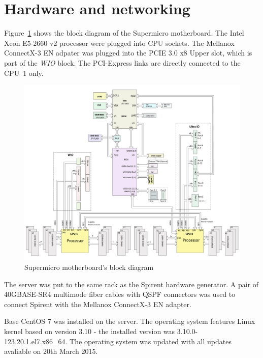 
\section{Hardware and networking}\label{sec:setup-hardware}
Figure~\ref{fig:setup-supermicro-board} shows the block diagram of the Supermicro motherboard.
The Intel Xeon E5-2660 v2 processor were plugged into CPU sockets.
The Mellanox ConnectX-3 EN adpater was plugged into the PCIE 3.0 x8 Upper slot,
which is part of the {\it{WIO}} block.
The PCI-Express links are directly connected to the CPU~1 only.
\begin{figure}
	\centering
	\includegraphics[width=15cm,keepaspectratio]{fig/supermicro-x10drui.png}
	\caption{Supermicro motherboard's block diagram}
	\label{fig:setup-supermicro-board}
\end{figure}

The server was put to the same rack as the Spirent hardware generator.
A pair of 40GBASE-SR4 multimode fiber cables with QSPF connectors
was used to connect Spirent with the Mellanox ConnectX-3 EN adapter.

Base CentOS 7 was installed on the server.
The operating system features Linux kernel based on version 3.10 -
the installed version was 3.10.0-123.20.1.el7.x86\_64.
The operating system was updated with all updates avaliable on 20th March 2015.

